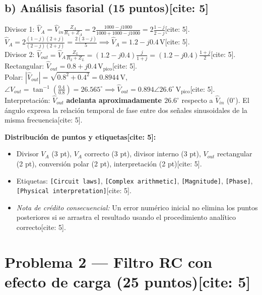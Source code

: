 \documentclass[11pt, a4paper]{article}
\begin{document}
\subsection*{b) Análisis fasorial (15 puntos)[cite: 5]}
Divisor 1: $\hat V_A = \hat V_{in} \frac{Z_A}{R_1 + Z_A} = 2 \frac{1000 - j1000}{1000 + 1000 - j1000} = 2 \frac{1-j}{2-j}$[cite: 5]. \\
$\hat V_A = 2 \frac{(1-j)(2+j)}{(2-j)(2+j)} = \frac{2(3-j)}{5} \implies \boxed{\hat V_A = 1.2 - j0.4\,\text{V}}$[cite: 5]. \\
Divisor 2: $\hat V_{out} = \hat V_A \frac{Z_L}{R_2 + Z_L} = (1.2 - j0.4) \frac{j}{1+j} = (1.2 - j0.4)\frac{1+j}{2}$[cite: 5]. \\
Rectangular: $\boxed{\hat V_{out} = 0.8 + j0.4\,\text{V}_{\text{pico}}}$[cite: 5]. \\
Polar: $|\hat V_{out}| = \sqrt{0.8^2 + 0.4^2} = 0.8944\,\text{V}$, $\angle V_{out} = \tan^{-1}\left(\frac{0.4}{0.8}\right) = 26.565^\circ \implies \boxed{\hat V_{out} = 0.894\angle26.6^\circ\,\text{V}_{\text{pico}}}$[cite: 5]. \\
Interpretación: $\hat V_{out}$ \textbf{adelanta aproximadamente $26.6^\circ$} respecto a $\hat V_{in}$ ($0^\circ$). El ángulo expresa la relación temporal de fase entre dos señales sinusoidales de la misma frecuencia[cite: 5].

\textbf{Distribución de puntos y etiquetas[cite: 5]:}
\begin{itemize}
    \item Divisor $V_A$ (3 pt), $V_A$ correcto (3 pt), divisor interno (3 pt), $V_{out}$ rectangular (2 pt), conversión polar (2 pt), interpretación (2 pt)[cite: 5].
    \item Etiquetas: \texttt{[Circuit laws]}, \texttt{[Complex arithmetic]}, \texttt{[Magnitude]}, \texttt{[Phase]}, \texttt{[Physical interpretation]}[cite: 5].
    \item \textit{Nota de crédito consecuencial:} Un error numérico inicial no elimina los puntos posteriores si se arrastra el resultado usando el procedimiento analítico correcto[cite: 5].
\end{itemize}

\section*{Problema 2 — Filtro RC con efecto de carga (25 puntos)[cite: 5]}
\end{document}
